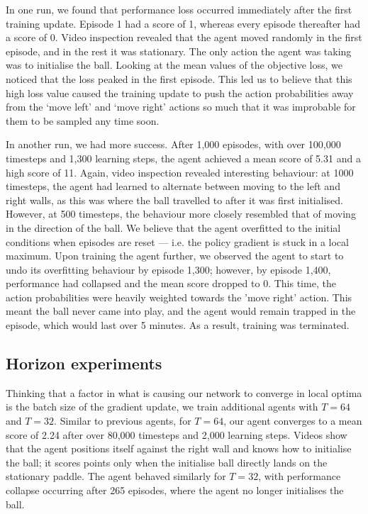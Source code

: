 \documentclass[12pt,a4paper]{article}
\begin{document}
In one run, we found that performance loss occurred immediately after the first training update. Episode 1 had a score of 1, whereas every episode thereafter had a score of 0. Video inspection revealed that the agent moved randomly in the first episode, and in the rest it was stationary. The only action the agent was taking was to initialise the ball. Looking at the mean values of the objective loss, we noticed that the loss peaked in the first episode. This led us to believe that this high loss value caused the training update to push the action probabilities away from the `move left' and `move right' actions so much that it was improbable for them to be sampled any time soon.

In another run, we had more success. After 1,000 episodes, with over 100,000 timesteps and 1,300 learning steps, the agent achieved a mean score of 5.31 and a high score of 11. Again, video inspection revealed interesting behaviour: at 1000 timesteps, the agent had learned to alternate between moving to the left and right walls, as this was where the ball travelled to after it was first initialised. However, at 500 timesteps, the behaviour more closely resembled that of moving in the direction of the ball. We believe that the agent overfitted to the initial conditions when episodes are reset --- i.e. the policy gradient is stuck in a local maximum. Upon training the agent further, we observed the agent to start to undo its overfitting behaviour by episode 1,300; however, by episode 1,400, performance had collapsed and the mean score dropped to 0. This time, the action probabilities were heavily weighted towards the 'move right' action. This meant the ball never came into play, and the agent would remain trapped in the episode, which would last over 5 minutes. As a result, training was terminated. 

\subsection{Horizon experiments}
Thinking that a factor in what is causing our network to converge in local optima is the batch size of the gradient update, we train additional agents with $T = 64$ and $T = 32$. Similar to previous agents, for $T = 64$, our agent converges to a mean score of 2.24 after over 80,000 timesteps and 2,000 learning steps. Videos show that the agent positions itself against the right wall and knows how to initialise the ball; it scores points only when the initialise ball directly lands on the stationary paddle. The agent behaved similarly for $T = 32$, with performance collapse occurring after 265 episodes, where the agent no longer initialises the ball. 
\end{document}
